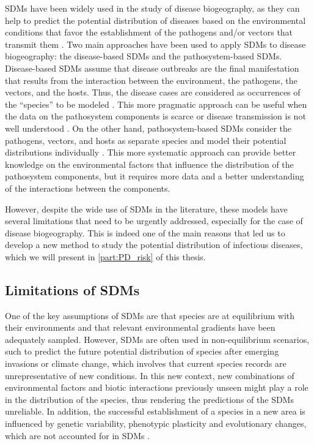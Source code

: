 SDMs have been widely used in the study of disease biogeography, as they can
help to predict the potential distribution of diseases based on the
environmental conditions that favor the establishment of the pathogens and/or
vectors that transmit them \cite{Pigott2014,Barro2016,Alimi2015}. Two main
approaches have been used to apply SDMs to disease biogeography: the
disease-based SDMs and the pathosystem-based SDMs. Disease-based SDMs assume
that disease outbreaks are the final manifestation that results from the
interaction between the environment, the pathogens, the vectors, and the hosts.
Thus, the disease cases are considered as occurrences of the ``species'' to be
modeled \cite{Pigott2015,Quiner2017}. This more pragmatic approach can be
useful when the data on the pathosystem components is scarce or disease
transmission is not well understood \cite{Johnson2019}. On the other hand,
pathosystem-based SDMs consider the pathogens, vectors, and hosts as separate
species and model their potential distributions individually
\cite{Samy2014,Baak2017}. This more systematic approach can provide better
knowledge on the environmental factors that influence the distribution of the
pathosystem components, but it requires more data and a better understanding of
the interactions between the components.

However, despite the wide use of SDMs in the literature, these models have
several limitations that need to be urgently addressed, especially for the case
of disease biogeography. This is indeed one of the main reasons that led us to
develop a new method to study the potential distribution of infectious
diseases, which we will present in \cref{part:PD_risk} of this thesis.

\subsection{\label{sec:Limitations of SDMs} Limitations of SDMs}

One of the key assumptions of SDMs are that species are at equilibrium with
their environments and that relevant environmental gradients have been
adequately sampled. However, SDMs are often used in non-equilibrium scenarios,
such to predict the future potential distribution of species after emerging
invasions or climate change, which involves that current species records are
unrepresentative of new conditions. In this new context, new combinations of
environmental factors and biotic interactions previously unseen might play a
role in the distribution of the species, thus rendering the predictions of the
SDMs unreliable. In addition, the successful establishment of a species in a
new area is influenced by genetic variability, phenotypic plasticity and
evolutionary changes, which are not accounted for in SDMs \cite{Elith2009}.

